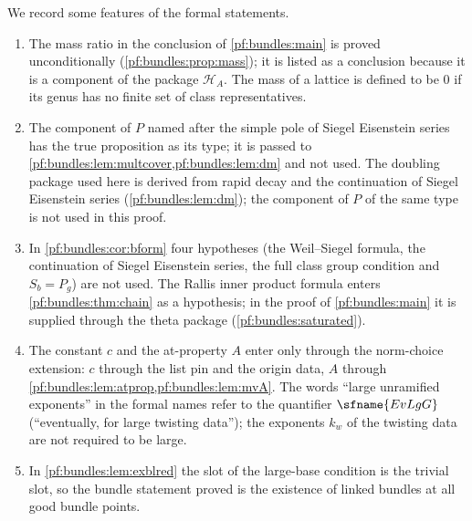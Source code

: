 \begin{remark}\label{pf:bundles:rem:peculiar}
We record some features of the formal statements.
\begin{enumerate}[label=(\alph*)]
\item The mass ratio in the conclusion of \cref{pf:bundles:main} is proved unconditionally (\cref{pf:bundles:prop:mass}); it is listed as a
conclusion because it is a component of the package $\mathcal H_A$. The mass of a lattice is defined to be $0$ if its genus has no finite set of
class representatives.
\item The component of $P$ named after the simple pole of Siegel Eisenstein series has the true proposition as its type; it is passed to
\cref{pf:bundles:lem:multcover,pf:bundles:lem:dm} and not used. The doubling package used here is derived from rapid decay and the continuation of
Siegel Eisenstein series (\cref{pf:bundles:lem:dm}); the component of $P$ of the same type is not used in this proof.
\item In \cref{pf:bundles:cor:bform} four hypotheses (the Weil--Siegel formula, the continuation of Siegel Eisenstein series, the full class group
condition and $S_b=P_g$) are not used. The Rallis inner product formula enters \cref{pf:bundles:thm:chain} as a hypothesis; in the proof of
\cref{pf:bundles:main} it is supplied through the theta package (\cref{pf:bundles:saturated}).
\item The constant $c$ and the at-property $A$ enter only through the norm-choice extension: $c$ through the list pin and the origin data, $A$
through \cref{pf:bundles:lem:atprop,pf:bundles:lem:mvA}. The words ``large unramified exponents'' in the formal names refer to the quantifier
$\sfname{EvLgG}$ (``eventually, for large twisting data''); the exponents $k_w$ of the twisting data are not required to be large.
\item In \cref{pf:bundles:lem:exblred} the slot of the large-base condition is the trivial slot, so the bundle statement proved is the existence of
linked bundles at all good bundle points.
\end{enumerate}
\end{remark}

